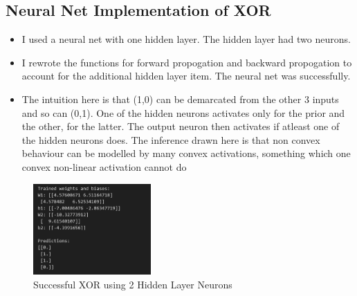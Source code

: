 \documentclass[12pt,a4paper]{article}
\begin{document}
\subsection{Neural Net Implementation of XOR}
\begin{itemize}
\item I used a neural net with one hidden layer. The hidden layer had two neurons.
\item I rewrote the functions for forward propogation and backward propogation to account for the additional hidden layer item. The neural net was successfully.
\item The intuition here is that (1,0) can be demarcated from the other 3 inputs and so can (0,1). One of the hidden neurons activates only for the prior and the other, for the latter. The output neuron then activates if atleast one of the hidden neurons does. The inference drawn here is that non convex behaviour can be modelled by many convex activations, something which one convex non-linear activation cannot do
\end{itemize}
\begin{figure}[h!]
    \centering
    \includegraphics[width=0.4\textwidth]{XOR_succ} 
    \caption{Successful XOR using 2 Hidden Layer Neurons}
    \label{fig:example}
\end{figure}
\end{document}
